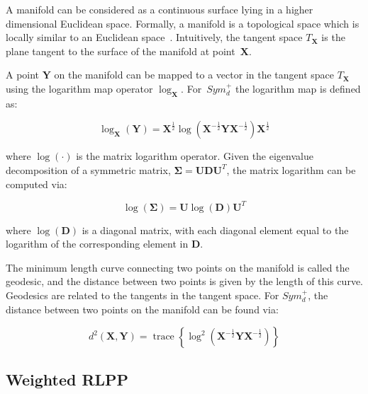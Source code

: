 \documentclass[10pt,twocolumn,letterpaper]{article}
\newcommand{\eqsize}{\footnotesize}
\newcommand{\mat}[1]{{\boldsymbol{#1}}}
\begin{document}
A manifold can be considered as a continuous surface lying in a higher dimensional Euclidean space.
Formally, a manifold is a topological space which is locally similar to an Euclidean space~\cite{TuzelEtAl2008}.
Intuitively, the tangent space {\eqsize $T_\mat{X}$} is the plane tangent to the surface of the manifold at point~{\eqsize $\mat{X}$}.

A point {\eqsize $\mat{Y}$} on the manifold can be mapped to a vector in the tangent space {\eqsize $T_{\mat{X}}$}
using the logarithm map operator {\eqsize $\log_{\mat{X}}$}.
For~{\eqsize $Sym_d^+$} the logarithm map is defined as:

\vspace{-1ex}
\eqsize
\begin{equation}
    \log_{\mat{X}}\left( \mat{Y} \right) = \mat{X}^{\frac{1}{2}}\log \left(\mat{X}^{-\frac{1}{2}} \mat{Y}\mat{X}^{-\frac{1}{2}} \right) \mat{X}^{\frac{1}{2}}
    \label{eqn:sym_log_map}
\end{equation}
\normalsize

\noindent
where {\eqsize $\log\left(\cdot\right)$} is the matrix logarithm operator.
Given the eigenvalue decomposition of a symmetric matrix,
\mbox{\eqsize $\mat{\Sigma} = \mat{U}\mat{D}\mat{U}^T$},
the matrix logarithm can be computed via:

\vspace{-1ex}
\eqsize
\begin{equation}
    \log(\mat{\Sigma}) = \mat{U} \log(\mat{D}) \mat{U}^T
\end{equation}
\normalsize

\noindent
where {\small $\log(\mat{D})$} is a diagonal matrix,
with each diagonal element equal to the logarithm of the corresponding element in {\small $\mat{D}$}.

The minimum length curve connecting two points on the manifold is called the geodesic,
and the distance between two points is given by the length of this curve.
Geodesics are related to the tangents in the tangent space.
For {\eqsize $Sym_d^+$}, the distance between two points on the manifold can be found via:

\noindent
\eqsize
\begin{equation}
  d^2(\mat{X},\mat{Y}) = \operatorname{trace}\left\{ \log^2 \left( \mat{X}^{-\frac{1}{2}} \mat{Y} \mat{X}^{-\frac{1}{2}} \right) \right\}
  \label{eq:geodesic}
\end{equation}
\normalsize



\subsection{Weighted RLPP}
\label{sec:wrlpp}
\end{document}

